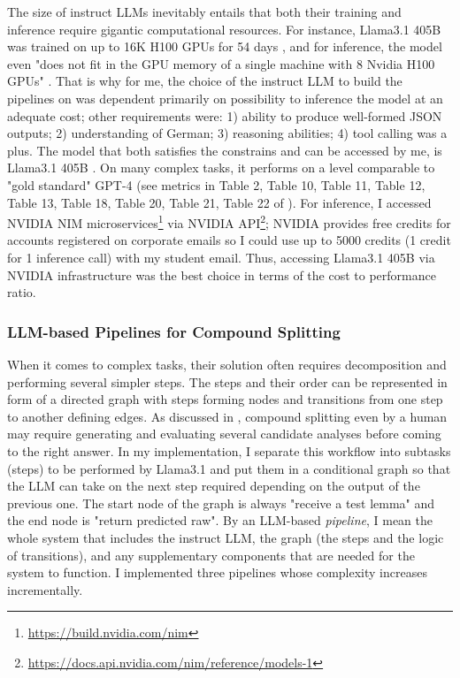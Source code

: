 \documentclass[11pt]{article}
\begin{document}
The size of instruct LLMs inevitably entails that both their training and inference require gigantic computational resources. For instance, Llama3.1 405B was trained on up to 16K H100 GPUs for 54 days \cite{dubey2024llama3herdmodels}, and for inference, the model even "does not fit in the GPU memory of a single machine with 8 Nvidia H100 GPUs" \cite{dubey2024llama3herdmodels}. That is why for me, the choice of the instruct LLM to build the pipelines on was dependent primarily on possibility to inference the model at an adequate cost; other requirements were: 1) ability to produce well-formed JSON outputs; 2) understanding of German; 3) reasoning abilities; 4) tool calling was a plus. The model that both satisfies the constrains and can be accessed by me, is Llama3.1 405B \cite{dubey2024llama3herdmodels}. On many complex tasks, it performs on a level comparable to "gold standard" GPT-4 (see metrics in Table 2, Table 10, Table 11, Table 12, Table 13, Table 18, Table 20, Table 21, Table 22 of \citealt{dubey2024llama3herdmodels}). For inference, I accessed NVIDIA NIM microservices\footnote{\url{https://build.nvidia.com/nim}} via NVIDIA API\footnote{\url{https://docs.api.nvidia.com/nim/reference/models-1}}; NVIDIA provides free credits for accounts registered on corporate emails so I could use up to 5000 credits (1 credit for 1 inference call) with my student email. Thus, accessing Llama3.1 405B via NVIDIA infrastructure was the best choice in terms of the cost to performance ratio.


\subsubsection{LLM-based Pipelines for Compound Splitting}

When it comes to complex tasks, their solution often requires decomposition and performing several simpler steps. The steps and their order can be represented in form of a directed graph with steps forming nodes and transitions from one step to another defining edges. As discussed in , compound splitting even by a human may require generating and evaluating several candidate analyses before coming to the right answer. In my implementation, I separate this workflow into subtasks (steps) to be performed by Llama3.1 and put them in a conditional graph so that the LLM can take on the next step required depending on the output of the previous one. The start node of the graph is always "receive a test lemma" and the end node is "return predicted raw". By an LLM-based \textit{pipeline}, I mean the whole system that includes the instruct LLM, the graph (the steps and the logic of transitions), and any supplementary components that are needed for the system to function. I implemented three pipelines whose complexity increases incrementally.
\end{document}
